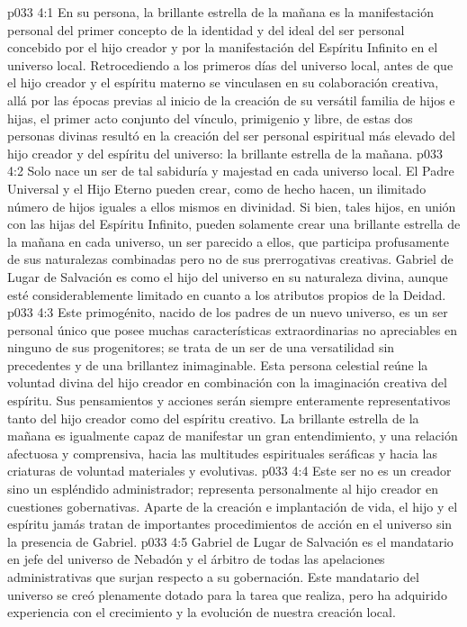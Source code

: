 \vs p033 4:1 En su persona, la brillante estrella de la mañana es la manifestación personal del primer concepto de la identidad y del ideal del ser personal concebido por el hijo creador y por la manifestación del Espíritu Infinito en el universo local. Retrocediendo a los primeros días del universo local, antes de que el hijo creador y el espíritu materno se vinculasen en su colaboración creativa, allá por las épocas previas al inicio de la creación de su versátil familia de hijos e hijas, el primer acto conjunto del vínculo, primigenio y libre, de estas dos personas divinas resultó en la creación del ser personal espiritual más elevado del hijo creador y del espíritu del universo: la brillante estrella de la mañana.
\vs p033 4:2 Solo nace un ser de tal sabiduría y majestad en cada universo local. El Padre Universal y el Hijo Eterno pueden crear, como de hecho hacen, un ilimitado número de hijos iguales a ellos mismos en divinidad. Si bien, tales hijos, en unión con las hijas del Espíritu Infinito, pueden solamente crear una brillante estrella de la mañana en cada universo, un ser parecido a ellos, que participa profusamente de sus naturalezas combinadas pero no de sus prerrogativas creativas. Gabriel de Lugar de Salvación es como el hijo del universo en su naturaleza divina, aunque esté considerablemente limitado en cuanto a los atributos propios de la Deidad.
\vs p033 4:3 Este primogénito, nacido de los padres de un nuevo universo, es un ser personal único que posee muchas características extraordinarias no apreciables en ninguno de sus progenitores; se trata de un ser de una versatilidad sin precedentes y de una brillantez inimaginable. Esta persona celestial reúne la voluntad divina del hijo creador en combinación con la imaginación creativa del espíritu. Sus pensamientos y acciones serán siempre enteramente representativos tanto del hijo creador como del espíritu creativo. La brillante estrella de la mañana es igualmente capaz de manifestar un gran entendimiento, y una relación afectuosa y comprensiva, hacia las multitudes espirituales seráficas y hacia las criaturas de voluntad materiales y evolutivas.
\vs p033 4:4 \pc Este ser no es un creador sino un espléndido administrador; representa personalmente al hijo creador en cuestiones gobernativas. Aparte de la creación e implantación de vida, el hijo y el espíritu jamás tratan de importantes procedimientos de acción en el universo sin la presencia de Gabriel.
\vs p033 4:5 Gabriel de Lugar de Salvación es el mandatario en jefe del universo de Nebadón y el árbitro de todas las apelaciones administrativas que surjan respecto a su gobernación. Este mandatario del universo se creó plenamente dotado para la tarea que realiza, pero ha adquirido experiencia con el crecimiento y la evolución de nuestra creación local.
